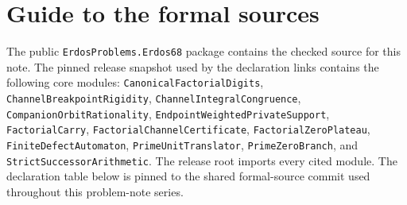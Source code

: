\documentclass[11pt]{article}
\begin{document}
\appendix
\section{Guide to the formal sources}\label{app:sources}

\begingroup
\raggedright
The public \texttt{ErdosProblems.Erdos68} package contains the checked source
for this note.  The pinned release snapshot used by the declaration links
contains the following core modules:
\texttt{CanonicalFactorialDigits},
\texttt{ChannelBreakpointRigidity},
\texttt{ChannelIntegralCongruence},
\texttt{CompanionOrbitRationality},
\texttt{EndpointWeightedPrivateSupport},
\texttt{FactorialCarry},
\texttt{FactorialChannelCertificate},
\texttt{FactorialZeroPlateau},
\texttt{FiniteDefectAutomaton},
\texttt{PrimeUnitTranslator},
\texttt{PrimeZeroBranch}, and
\texttt{StrictSuccessorArithmetic}.
The release root imports every cited module.  The declaration table below is
pinned to the shared formal-source commit used throughout this problem-note
series.\par
\endgroup
\end{document}
